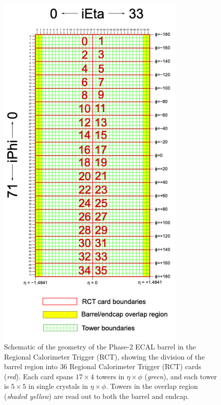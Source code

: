 \begin{figure}[ht]
    \centering
    \includegraphics[width=9cm]{figures/ch-3-phase2/phase-2-rct-cards-schematic.png}
    \caption{Schematic of the geometry of the Phase-2 ECAL barrel in the Regional Calorimeter Trigger (RCT), showing the division of the barrel region into 36 Regional Calorimeter Trigger (RCT) cards (\textit{red}). Each card spans $17 \times 4$ towers in $\eta \times \phi$ (\textit{green}), and each tower is $5\times 5$ in single crystals in $\eta \times \phi$. Towers in the overlap region (\textit{shaded yellow}) are read out to both the barrel and endcap.}
    \label{fig:phase-2-rct-cards-schematic}
\end{figure}

